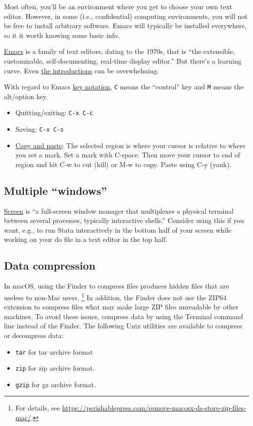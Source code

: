 Most often, you'll be an environment where you get to choose your own text editor.
However, in some (i.e., confidential) computing environments, you will not be free to install arbitrary software.
Emacs will typically be installed everywhere, so it it worth knowing some basic info.

\href{https://en.wikipedia.org/wiki/Emacs}{Emacs} is a family of text editors, dating to the 1970s, that is ``the extensible, customizable, self-documenting, real-time display editor.''
But there's a learning curve.
Even \href{https://www.gnu.org/software/emacs/tour/}{the introductions} can be overwhelming.

With regard to Emacs \href{https://www.emacswiki.org/emacs/EmacsKeyNotation}{key notation},
\texttt{C} means the ``control'' key and \texttt{M} means the alt/option key.

\begin{itemize}
	\item Quitting/exiting: \texttt{C-x C-c}
	\item Saving: \texttt{C-x C-s}
	\item \href{https://www.emacswiki.org/emacs/CopyAndPaste}{Copy and paste}:
	The selected region is where your cursor is relative to where you set a mark.
	Set a mark with C-space.
	Then move your cursor to end of region and hit C-w to cut (kill) or M-w to copy.
	Paste using C-y (yank).

\end{itemize}

\subsection{Multiple ``windows''}

\href{https://www.gnu.org/software/screen/manual/}{Screen} is ``a full-screen window manager that multiplexes a physical terminal between several processes, typically interactive shells.''
Consider using this if you want, e.g., to run Stata interactively in the bottom half of your screen while working on your do file in a text editor in the top half.

\subsection{Data compression}
In macOS, using the Finder to compress files produces hidden files that are useless to non-Mac users.%
\footnote{For details, see \url{https://perishablepress.com/remove-macosx-ds-store-zip-files-mac/}.}
In addition, the Finder does not use the ZIP64 extension to compress files what may make large ZIP files unreadable by other machines.
To avoid these issues, compress data by using the Terminal command line instead of the Finder.
The following Unix utilities are available to compress or decompress data:
\begin{itemize}
	\item \texttt{tar} for tar archive format
	\item \texttt{zip} for zip archive format.
	\item \texttt{gzip} for gz archive format.
\end{itemize}


